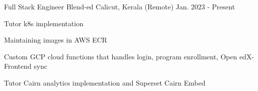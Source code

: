 \begin{cventries}
  \cventry
    {Full Stack Engineer } %
    {Blend-ed} %
    {Calicut, Kerala (Remote)} %
    {Jan. 2023 - Present} %
    {
      \begin{cvitems} %
        \item Tutor k8s implementation
        \item Maintaining images in AWS ECR
        \item Custom GCP cloud functions that handles login, program enrollment, Open edX-Frontend sync
        \item Tutor Cairn analytics implementation and Superset Cairn Embed
      \end{cvitems}
    } 
\end{cventries}
